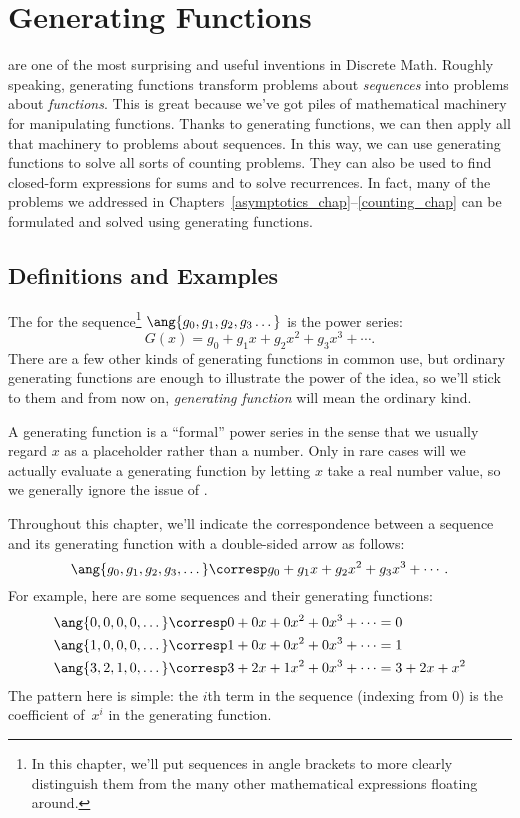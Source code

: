 \chapter{Generating Functions}\label{generating_function_chap}

 are one of the most surprising and useful
inventions in Discrete Math.  Roughly speaking, generating functions
transform problems about \emph{sequences} into problems about
\emph{functions}.  This is great because we've got piles of
mathematical machinery for manipulating functions.  Thanks to
generating functions, we can then apply all that machinery to problems
about sequences.  In this way, we can use generating functions to
solve all sorts of counting problems.  They can also be used to find
closed-form expressions for sums and to solve recurrences.  In fact,
many of the problems we addressed in
Chapters~\hbox{\ref{asymptotics_chap}--\ref{counting_chap}} can be
formulated and solved using generating functions.

\section{Definitions and Examples}

The  for the sequence\footnote{In
  this chapter, we'll put sequences in angle brackets to more clearly
  distinguish them from the many other mathematical expressions
  floating around.} $\ang{g_0, g_1, g_2, g_3 \dots}$ is the power
series:
\[
G(x) = g_0 + g_1 x + g_2 x^2 + g_3 x^3 + \cdots.
\]
There are a few other kinds of generating functions in common use, but
ordinary generating functions are enough to illustrate the power of
the idea, so we'll stick to them and from now on, \emph{generating
  function} will mean the ordinary kind.

A generating function is a ``formal'' power series in the sense that we
usually regard $x$ as a placeholder rather than a number.  Only in rare
cases will we actually evaluate a generating function by letting $x$ take
a real number value, so we generally ignore the issue of .

Throughout this chapter, we'll indicate the correspondence between a
sequence and its generating function with a double-sided arrow as
follows:
%
\[
\ang{g_0, g_1, g_2, g_3, \dots}
    \corresp g_0 + g_1 x + g_2 x^2 + g_3 x^3 + \cdots.
\]
%
For example, here are some sequences and their generating functions:
%
\begin{align*}
\ang{0, 0, 0, 0, \dots}
    & \corresp 0 + 0 x + 0 x^2 + 0 x^3 + \cdots = 0 \\
\ang{1, 0, 0, 0, \dots}
    & \corresp 1 + 0 x + 0 x^2 + 0 x^3 + \cdots = 1 \\
\ang{3, 2, 1, 0, \dots}
    & \corresp 3 + 2 x + 1 x^2 + 0 x^3 + \cdots = 3 + 2 x + x^2
\end{align*}
%
The pattern here is simple: the $i$th term in the sequence (indexing
from 0) is the coefficient of~$x^i$ in the generating function.


